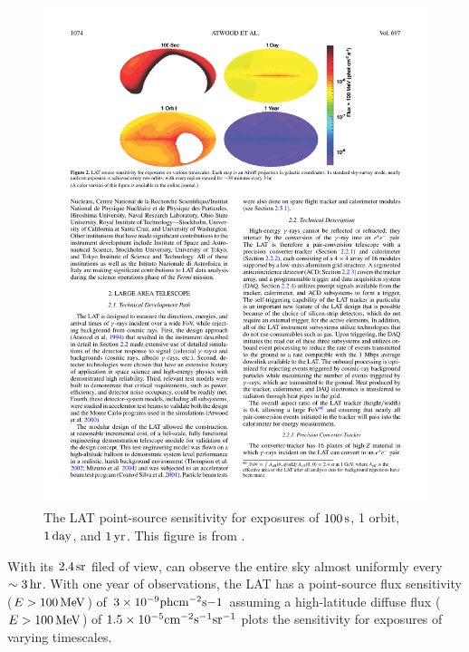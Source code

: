 \begin{figure}[htbp]
  \centering
  \includegraphics{chapters/introduction/figures/lat_point_source_sensitivity.pdf}
  \caption{
  The \ac{LAT} point-source sensitivity for exposures of
  $100\,\text{s}$, 1 orbit, $1\,\text{day}$,
  and $1\,\text{yr}$.  This figure is from
  \cite{atwood_2009a_large-telescope}.
  }
\end{figure} 


With its $2.4\,\text{sr}$ filed of view, \fermi can observe
the entire sky almost uniformly every $\sim3\,\text{hr}$.
With one year of observations, the \ac{LAT} has a point-source
flux sensitivity ($E>100\,\text{MeV}$) of $3 \times 10^{-9}
\text{ph} \text{cm}^{-2}\text{s}{-1}$ assuming a high-latitude diffuse flux
($E>100\,\text{MeV}$) of $1.5\times10^{-5}\text{cm}^{-2}\text{s}^{-1}\text{sr}^{-1}$
 plots the sensitivity
for exposures of varying timescales.


